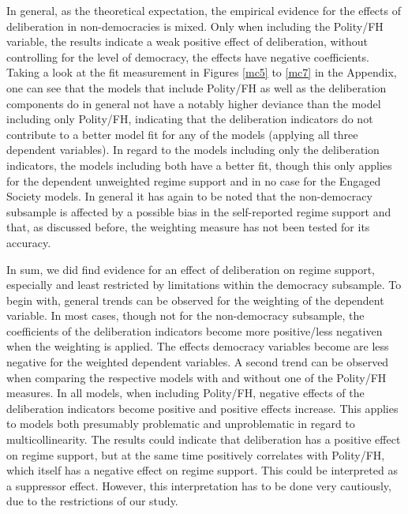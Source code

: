 \documentclass[]{article}
\begin{document}
In general, as the theoretical expectation, the empirical evidence for
the effects of deliberation in non-democracies is mixed. Only when
including the Polity/FH variable, the results indicate a weak positive
effect of deliberation, without controlling for the level of democracy,
the effects have negative coefficients. Taking a look at the fit
measurement in Figures \ref{mc5} to \ref{mc7} in the Appendix, one can
see that the models that include Polity/FH as well as the deliberation
components do in general not have a notably higher deviance than the
model including only Polity/FH, indicating that the deliberation
indicators do not contribute to a better model fit for any of the models
(applying all three dependent variables). In regard to the models
including only the deliberation indicators, the models including both
have a better fit, though this only applies for the dependent unweighted
regime support and in no case for the Engaged Society models. In general
it has again to be noted that the non-democracy subsample is affected by
a possible bias in the self-reported regime support and that, as
discussed before, the weighting measure has not been tested for its
accuracy.

In sum, we did find evidence for an effect of deliberation on regime
support, especially and least restricted by limitations within the
democracy subsample. To begin with, general trends can be observed for
the weighting of the dependent variable. In most cases, though not for
the non-democracy subsample, the coefficients of the deliberation
indicators become more positive/less negativen when the weighting is
applied. The effects democracy variables become are less negative for
the weighted dependent variables. A second trend can be observed when
comparing the respective models with and without one of the Polity/FH
measures. In all models, when including Polity/FH, negative effects of
the deliberation indicators become positive and positive effects
increase. This applies to models both presumably problematic and
unproblematic in regard to multicollinearity. The results could indicate
that deliberation has a positive effect on regime support, but at the
same time positively correlates with Polity/FH, which itself has a
negative effect on regime support. This could be interpreted as a
suppressor effect. However, this interpretation has to be done very
cautiously, due to the restrictions of our study.
\end{document}
